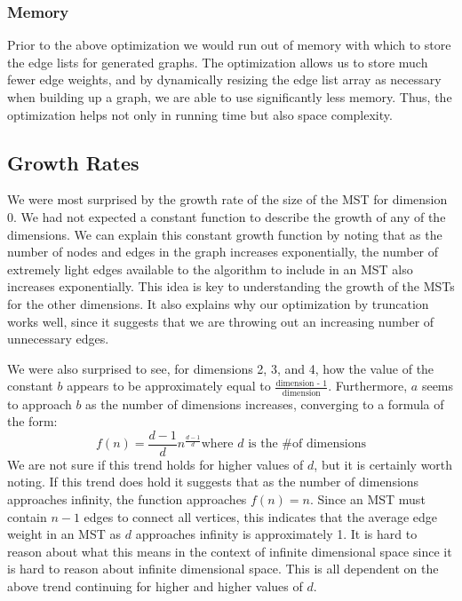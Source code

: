 \documentclass[solution, letterpaper]{cs121}
\begin{document}
\subsubsection*{Memory}
\hspace{5mm} Prior to the above optimization we would run out of memory with which to store the edge lists for generated graphs. The optimization allows us to store much fewer edge weights, and by dynamically resizing the edge list array as necessary when building up a graph, we are able to use significantly less memory. Thus, the optimization helps not only in running time but also space complexity.

\subsection*{Growth Rates}
\hspace{5mm} We were most surprised by the growth rate of the size of the MST for dimension 0. We had not expected a constant function to describe the growth of any of the dimensions. We can explain this constant growth function by noting that as the number of nodes and edges in the graph increases exponentially, the number of extremely light edges available to the algorithm to include in an MST also increases exponentially. This idea is key to understanding the growth of the MSTs for the other dimensions. It also explains why our optimization by truncation works well, since it suggests that we are throwing out an increasing number of unnecessary edges.

We were also surprised to see, for dimensions 2, 3, and 4, how the value of the constant $b$ appears to be approximately equal to $\frac{\text{dimension - 1}}{\text{dimension}}$. Furthermore, $a$ seems to approach $b$ as the number of dimensions increases, converging to a formula of the form:
\[
f(n) = \dfrac{d-1}{d}n^{\frac{d-1}{d}} \text{where $d$ is the \# of dimensions}
\]
\hspace{5mm} We are not sure if this trend holds for higher values of $d$, but it is certainly worth noting. If this trend does hold it suggests that as the number of dimensions approaches infinity, the function approaches $f(n) = n$. Since an MST must contain $n - 1$ edges to connect all vertices, this indicates that the average edge weight in an MST as $d$ approaches infinity is approximately 1. It is hard to reason about what this means in the context of infinite dimensional space since it is hard to reason about infinite dimensional space. This is all dependent on the above trend continuing for higher and higher values of $d$.
\end{document}

